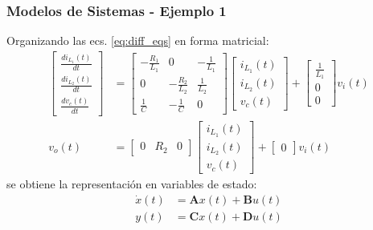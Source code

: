 \documentclass[aspectratio=169,handout]{beamer}
\theoremstyle{definition}
\theoremstyle{plain}
\theoremstyle{remark}
\begin{document}
\begin{frame}[<+->]\frametitle{Modelos de Sistemas - Ejemplo 1}
Organizando las ecs. \eqref{eq:diff_eqs} en forma matricial:
\begin{subequations}
\begin{align}
  \begin{bmatrix}
   \frac{di_{L_1}(t)}{dt} \\ \frac{di_{L_2}(t)}{dt} \\ \frac{dv_c(t)}{dt} 
  \end{bmatrix} &= 
  \begin{bmatrix}
  -\frac{R_1}{L_1} & 0 & -\frac{1}{L_1} \\
  0 & -\frac{R_2}{L_2} &  \frac{1}{L_2} \\
  \frac{1}{C} & -\frac{1}{C} & 0
  \end{bmatrix}
  \begin{bmatrix}
   i_{L_1}(t) \\ i_{L_2}(t) \\ v_c(t) 
  \end{bmatrix} + 
  \begin{bmatrix}
    \frac{1}{L_1} \\ 0 \\ 0
  \end{bmatrix} v_i(t)\\
  v_o(t) &=
  \begin{bmatrix}
    0 & R_2 & 0
  \end{bmatrix}
  \begin{bmatrix}
   i_{L_1}(t) \\ i_{L_2}(t) \\ v_c(t) 
  \end{bmatrix} + 
  \begin{bmatrix}
    0
  \end{bmatrix} v_i(t)
\end{align}
\end{subequations}
se obtiene la representación en variables de estado:
\begin{subequations}
  \begin{align}
    \dot{x}(t) &= \mathbf{A} x(t) + \mathbf{B}u(t)\\
    y(t) &= \mathbf{C}x(t) + \mathbf{D}u(t)
  \end{align}
\end{subequations}
\end{frame}
\end{document}
